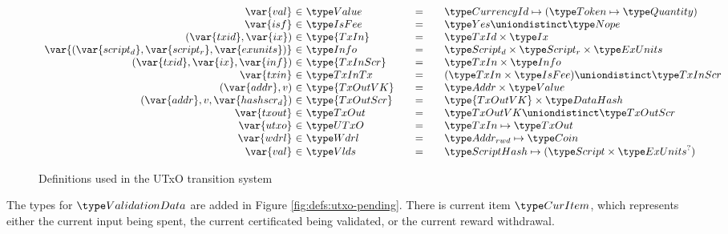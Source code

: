 \begin{figure*}[htb]
\begin{equation*}
\begin{array}{r@{~\in~}l@{\qquad=\qquad}lr}
      \var{val} & \Value
      & \CurrencyId \mapsto (\Token \mapsto \Quantity)
      \\
      \var{isf}
      & \IsFee
      & \Yes \uniondistinct \Nope
      \\
      (\var{txid}, \var{ix})
      & \type{TxIn}
      & \TxId \times \Ix
      \\
      \var{(\var{script_d},\var{script_r},\var{exunits})}
      & \Info
      & \ScriptD \times \ScriptR \times \ExUnits
      \\
      (\var{txid}, \var{ix}, \var{inf})
      & \type{TxInScr}
      & \TxIn \times \Info
      \\
      \var{txin}
      & \TxInTx
      & (\TxIn \times \IsFee) \uniondistinct \TxInScr
      \\
      (\var{addr}, v)
      & \type{TxOutVK}
      & \Addr \times \Value
      \\
      (\var{addr}, v, \var{hashscr_d})
      & \type{TxOutScr}
      & \type{TxOutVK} \times \HashDat
      \\
      \var{txout}
      & \TxOut
      & \TxOutVK \uniondistinct \TxOutScr
      \\
      \var{utxo}
      & \UTxO
      & \TxIn \mapsto \TxOut
      \\
      \var{wdrl}
      & \Wdrl
      & \AddrRWD \mapsto \Coin
      \\
      \var{val}
      & \Vlds
      & \HashScr \mapsto (\Script \times \ExUnits^?)
    \end{array}
  \end{equation*}
  \caption{Definitions used in the UTxO transition system}
  \label{fig:defs:utxo-shelley-1}
\end{figure*}

The types for $\ValidationData$ are added in Figure \ref{fig:defs:utxo-pending}.
There is current item $\CurItem$, which represents either the current input being
spent, the current certificated being validated, or the current reward
withdrawal.

